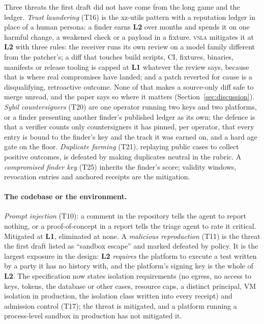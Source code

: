 \documentclass[11pt]{article}
\newcommand{\vsla}{\textsc{vsla}}
\newcommand{\lvl}[1]{\textbf{L#1}}
\begin{document}
Three threats the first draft did not have come from the long game and the ledger. \emph{Trust laundering}
(T16) is the xz-utils pattern with a reputation ledger in place of a human persona: a finder earns \lvl{2} over
months and spends it on one harmful change, a weakened check or a payload in a fixture. \vsla{} mitigates it at
\lvl{2} with three rules: the receiver runs its own review on a model family different from the patcher's; a
diff that touches build scripts, CI, fixtures, binaries, manifests or release tooling is capped at \lvl{1}
whatever the review says, because that is where real compromises have landed; and a patch reverted for cause
is a disqualifying, retroactive outcome. None of that makes a source-only diff safe to merge unread, and the
paper says so where it matters (Section~\ref{sec:discussion}). \emph{Sybil countersigners} (T20) are one
operator running two keys and two platforms, or a finder presenting another finder's published ledger as its own;
the defence is that a verifier counts only countersigners it has pinned, per operator, that every entry is bound to
the finder's key and the track it was earned on, and a hard age gate on the floor. \emph{Duplicate farming} (T21), replaying public cases to collect
positive outcomes, is defeated by making duplicates neutral in the rubric. A \emph{compromised finder key}
(T25) inherits the finder's score; validity windows, revocation entries and anchored receipts are the
mitigation.

\paragraph{The codebase or the environment.} \emph{Prompt injection} (T10): a comment in the repository tells
the agent to report nothing, or a proof-of-concept in a report tells the triage agent to rate it critical.
Mitigated at \lvl{1}, eliminated at none. A \emph{malicious reproduction} (T11) is the threat the first draft
listed as ``sandbox escape'' and marked defeated by policy. It is the largest exposure in the design: \lvl{2}
\emph{requires} the platform to execute a test written by a party it has no history with, and the platform's
signing key is the whole of \lvl{2}. The specification now states isolation requirements (no egress, no access
to keys, tokens, the database or other cases, resource caps, a distinct principal, VM isolation in production,
the isolation class written into every receipt) and admission control (T17); the threat is mitigated, and a
platform running a process-level sandbox in production has not mitigated it.
\end{document}
